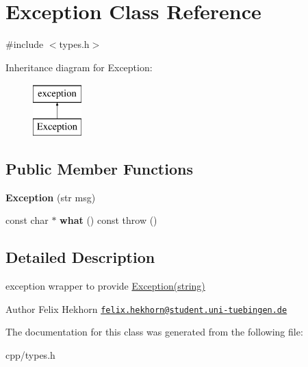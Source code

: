 \hypertarget{class_exception}{\section{Exception Class Reference}
\label{class_exception}
}


{\ttfamily \#include $<$types.\-h$>$}

Inheritance diagram for Exception\-:\begin{figure}[H]
\begin{center}
\leavevmode
\includegraphics[height=2.000000cm]{class_exception}
\end{center}
\end{figure}
\subsection*{Public Member Functions}
\begin{DoxyCompactItemize}
\item 
\hypertarget{class_exception_a4821522f27880a019004c8324af2b8bd}{{\bfseries Exception} (str msg)}\label{class_exception_a4821522f27880a019004c8324af2b8bd}

\item 
\hypertarget{class_exception_a45642915395d3b813fedc2593fbcb8bb}{const char $\ast$ {\bfseries what} () const   throw ()}\label{class_exception_a45642915395d3b813fedc2593fbcb8bb}

\end{DoxyCompactItemize}


\subsection{Detailed Description}
exception wrapper to provide \hyperlink{class_exception}{Exception(string)} \begin{DoxyAuthor}{Author}
Felix Hekhorn \href{mailto:felix.hekhorn@student.uni-tuebingen.de}{\tt felix.\-hekhorn@student.\-uni-\/tuebingen.\-de} 
\end{DoxyAuthor}


The documentation for this class was generated from the following file\-:\begin{DoxyCompactItemize}
\item 
cpp/types.\-h\end{DoxyCompactItemize}
